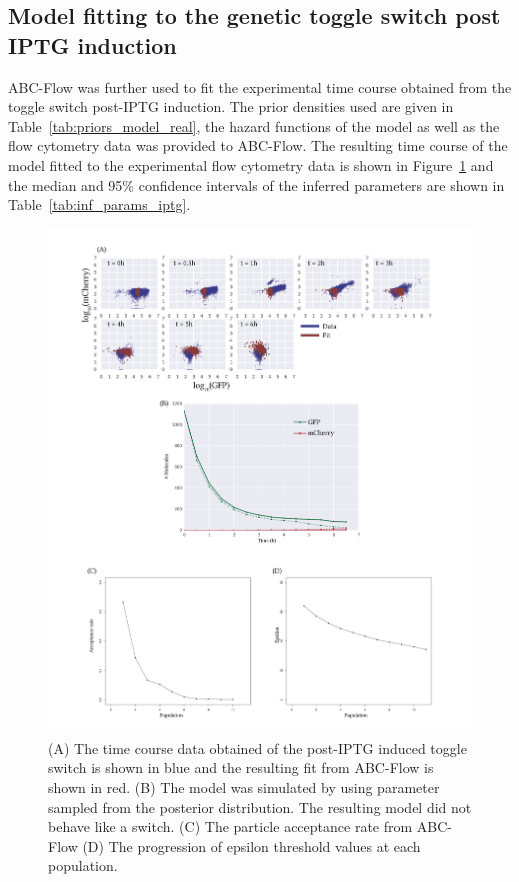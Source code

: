 \subsection{Model fitting to the genetic toggle switch post IPTG induction}
ABC-Flow was further used to fit the experimental time course obtained from the toggle switch post-IPTG induction. The prior densities used are given in Table~\ref{tab:priors_model_real}, the hazard functions of the model as well as the flow cytometry data was provided to ABC-Flow. The resulting time course of the model fitted to the experimental flow cytometry data is shown in Figure~\ref{fig:1d-real-res-iptg} and the median and 95\% confidence intervals of the inferred parameters are shown in Table~\ref{tab:inf_params_iptg}.


\begin{figure}[htbp]
\centerfloat%
	\includegraphics[width=1.2\textwidth]{../../chapters/chapterABCFlow/images/2D_real_res_IPTG.png}
	\caption[ABC-Flow fit to post-\acrshort{atc} time course data]{\label{fig:1d-real-res-iptg} (A) The time course data obtained of the post-IPTG induced toggle switch is shown in blue and the resulting fit from ABC-Flow is shown in red. (B) The model was simulated by using parameter sampled from the posterior distribution. The resulting model did not behave like a switch. (C) The particle acceptance rate from ABC-Flow (D) The progression of epsilon threshold values at each population.  }
\end{figure}

